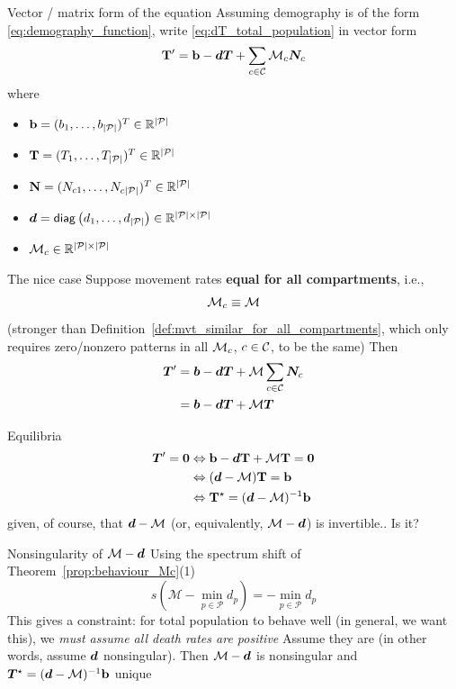 \documentclass[aspectratio=169]{beamer}\usepackage[]{graphicx}\usepackage[]{xcolor}
\begin{document}
\begin{frame}{Vector / matrix form of the equation}
Assuming demography is of the form \eqref{eq:demography_function}, write \eqref{eq:dT_total_population} in vector form
\begin{equation}\label{sys:dN_general} 
	\mathbf{T}'=\mathbf{b}-\bm{d}\bm{T}+\sum_{c\in\mathcal{C}}\mathcal{M}_c\bm{N}_{c}	
\end{equation}
where 
\begin{itemize}
	\item $\mathbf{b}=(b_1,\ldots,b_{|\mathcal{P}|})^T\in\mathbb{R}^{|\mathcal{P}|}$
	\item $\mathbf{T}=(T_1,\ldots,T_{|\mathcal{P}|})^T\in\mathbb{R}^{|\mathcal{P}|}$
	\item $\mathbf{N}=(N_{c1},\ldots,N_{c{|\mathcal{P}|}})^T\in\mathbb{R}^{|\mathcal{P}|}$
	\item $\bm{d}=\mathsf{diag}\left(d_1,\ldots,d_{|\mathcal{P}|}\right)\in\mathbb{R}^{|\mathcal{P}|\times|\mathcal{P}|}$
	\item $\mathcal{M}_c\in\mathbb{R}^{|\mathcal{P}|\times|\mathcal{P}|}$
\end{itemize}

\end{frame}


\begin{frame}{The nice case}
Suppose movement rates \textbf{equal for all compartments}, i.e.,
$$
\mathcal{M}_c\equiv\mathcal{M}
$$
\vfill
(stronger than Definition~\ref{def:mvt_similar_for_all_compartments}, which only requires zero/nonzero patterns in all $\mathcal{M}_c$, $c\in\mathcal{C}$, to be the same)
\vfill
Then
\begin{align}
\bm{T}' &= \bm{b}-\bm{d}\bm{T}+\mathcal{M}\sum_{c\in\mathcal{C}}\bm{N}_{c} \nonumber \\
&= \bm{b}-\bm{d}\bm{T}+\mathcal{M}\bm{T} \label{sys:pSLIRS_toy_dN}
\end{align}
\end{frame}


\begin{frame}{Equilibria}
$$
\begin{aligned}
\bT'=\b0 &\Leftrightarrow \mathbf{b}-\bd\mathbf{T}+\mathcal{M}\mathbf{T}=\mathbf{0} \\
&\Leftrightarrow (\bd-\mathcal{M})\mathbf{T}=\mathbf{b} \\
&\Leftrightarrow \mathbf{T}^\star=(\bd-\mathcal{M})^{-1}\mathbf{b}
\end{aligned}
$$
given, of course, that $\bm{d}-\mathcal{M}$ (or, equivalently, $\mathcal{M}-\bm{d}$) is invertible.. 
\vfill
Is it?
\end{frame}

\begin{frame}{Nonsingularity of $\mathcal{M}-\bm{d}$}
Using the spectrum shift of Theorem~\ref{prop:behaviour_Mc}{(1)}
\[
s\left(\mathcal{M}-\min_{p\in\mathcal{P}}d_p\right)=-\min_{p\in\mathcal{P}}d_p
\]
This gives a constraint: for total population to behave well (in general, we want this), we \emph{must assume all death rates are positive}
\vfill
Assume they are (in other words, assume $\bm{d}$ nonsingular). Then $\mathcal{M}-\bm{d}$ is nonsingular and $\bm{T}^\star=(\bm{d}-\mathcal{M})^{-1}\mathbf{b}$ unique
\end{frame}
\end{document}
